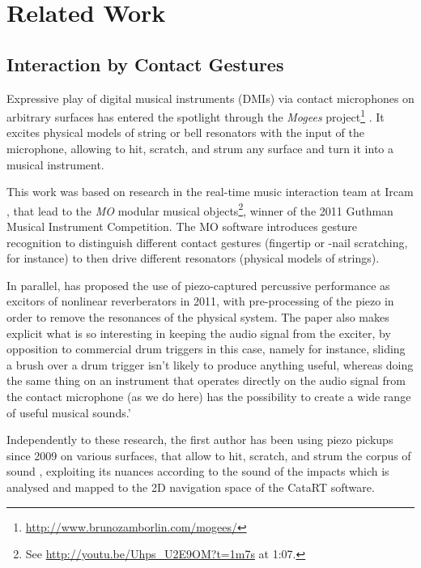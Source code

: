 \section{Related Work}\label{sec:related}

\subsection{Interaction by Contact Gestures}

Expressive play of digital musical instruments (DMIs) via contact microphones on arbitrary surfaces has entered the spotlight through the \textit{Mogees} project\footnote{\url{http://www.brunozamborlin.com/mogees/}}  \cite{Zamborlin14a}.  It excites physical models of string or bell resonators with the input of the microphone, allowing to hit, scratch, and strum any surface and turn it into a musical instrument.  

This work was based on research in the real-time music interaction team at Ircam \cite{Rasamimanana11a,Bevilacqua11b}, that lead to the \textit{MO} modular musical objects\footnote{See \url{http://youtu.be/Uhps_U2E9OM?t=1m7s} at 1:07.}, winner of the 2011 Guthman Musical Instrument Competition.
The MO software introduces gesture recognition to distinguish different contact gestures (fingertip or -nail scratching, for instance) to then drive different resonators (physical models of strings).

In parallel, \cite{Puckette-icmc2011-infuriating-nonlinear-reverberator} has proposed the use of piezo-captured percussive performance as excitors of nonlinear reverberators in 2011, with pre-processing of the piezo in order to remove the resonances of the physical system. The paper also makes explicit what is so interesting in keeping the audio signal from the exciter, by opposition to commercial drum triggers in this case, namely for instance, sliding a brush over a drum trigger isn't likely to produce anything useful, whereas doing the same thing on an instrument that operates directly on the audio signal from the contact microphone (as we do here) has the possibility to create a wide range of useful musical sounds.'

Independently to these research, the first author has been using piezo pickups since 2009 on various surfaces, that allow to hit, scratch, and strum the corpus of sound \cite{Schwarz-nime2012-sound-space}, exploiting
its nuances according to the sound of the impacts which is analysed and mapped to
the 2D navigation space of the CataRT software.


